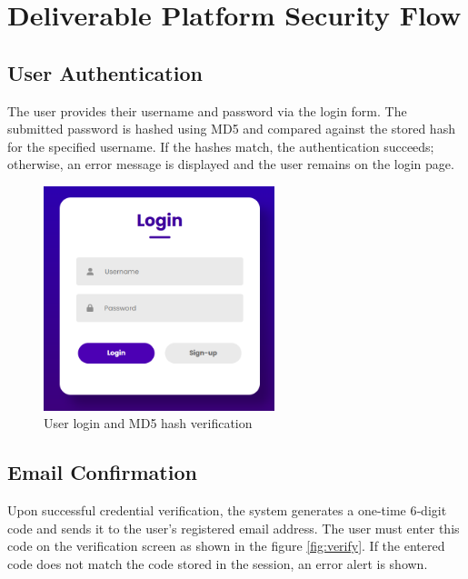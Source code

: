\section{Deliverable Platform Security Flow}

\subsection{User Authentication}
The user provides their username and password via the login form. The submitted password is hashed using MD5 and compared against the stored hash for the specified username. If the hashes match, the authentication succeeds; otherwise, an error message is displayed and the user remains on the login page.

\begin{figure}[h]
  \centering
  \includegraphics[width=0.6\textwidth]{figs/login.png}
  \caption{User login and MD5 hash verification}
  \label{fig:login}
\end{figure}
\newpage
\subsection{Email Confirmation}
Upon successful credential verification, the system generates a one-time 6‑digit code and sends it to the user’s registered email address. The user must enter this code on the verification screen as shown in the figure \ref{fig:verify}. If the entered code does not match the code stored in the session, an error alert is shown. 


